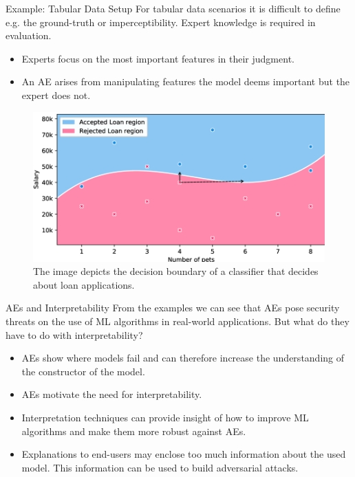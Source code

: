 \documentclass[11pt,compress,t,notes=noshow, xcolor=table]{beamer}
\begin{document}
\begin{vbframe}{Example: Tabular Data Setup}
For tabular data scenarios it is difficult to define e.g. the ground-truth or imperceptibility. Expert knowledge is required in evaluation.
\begin{itemize}
    \item Experts focus on the most important features in their judgment.
    \item An AE arises from manipulating features the model deems important but the expert does not.
\end{itemize}
\begin{figure}[h]
\centering
\includegraphics[width=0.6\linewidth]{slides/local-explanations/figure/AEloanApplication.png}
  \caption{The image depicts the decision boundary of a classifier that decides about loan applications.}
  \label{fig:mnist}
\end{figure} 
\end{vbframe}

\begin{vbframe}{AEs and Interpretability}
From the examples we can see that AEs pose security threats on the use of ML algorithms in real-world applications. But what do they have to do with interpretability?

\begin{itemize}
    \item AEs show where models fail and can therefore increase the understanding of the constructor of the model.
    \item AEs motivate the need for interpretability.
    \item Interpretation techniques can provide insight of how to improve ML algorithms and make them more robust against AEs.
    \item Explanations to end-users may enclose too much information about the used model. This information can be used to build adversarial attacks.
\end{itemize}
\end{vbframe}
\end{document}
